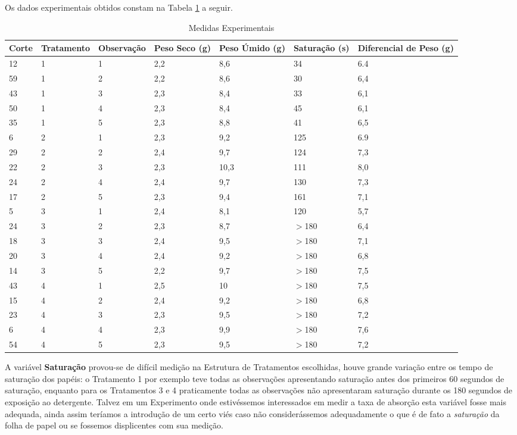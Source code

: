 \documentclass[a4paper,12pt,notitlepage]{article}
\begin{document}
    Os dados experimentais obtidos constam na Tabela \ref{tabela:dados} a seguir.
\begin{table}[!htb]
    \centering
    \begin{tabular}{p{9mm}|p{20mm}|p{19mm}|p{15mm}|p{15mm}|p{19mm}|p{15mm}}
    Corte & Tratamento & Observação &Peso Seco (g)& Peso Úmido (g)& Saturação (s)&Diferencial de Peso (g)\\
    \hline\hline
        12&1&1 & 2,2 & 8,6 & 34 & 6.4 \\
        59&1&2 & 2,2 & 8,6 & 30 & 6,4 \\
        43&1&3 & 2,3 & 8,4 & 33 & 6,1 \\
        50&1&4 & 2,3 & 8,4 & 45 & 6,1 \\
        35&1&5 & 2,3 & 8,8 & 41 & 6,5 \\
        \hline
    
        6&2&1 & 2,3 & 9,2 & 125 & 6.9 \\
        29&2&2 & 2,4 & 9,7 & 124 & 7,3 \\
        22&2&3 & 2,3 & 10,3 & 111 & 8,0 \\
        24&2&4 & 2,4 & 9,7 & 130 & 7,3 \\
        17&2&5 & 2,3 & 9,4 & 161 & 7,1 \\
        \hline
        
        5&3&1 & 2,4 & 8,1 & 120 & 5,7 \\
        24&3&2 & 2,3 & 8,7 & $>$180 & 6,4 \\
        18&3&3 & 2,4 & 9,5 & $>$180 & 7,1 \\
        20&3&4 & 2,4 & 9,2 & $>$180 & 6,8 \\
        14&3&5 & 2,2 & 9,7 & $>$180 & 7,5 \\
        \hline
        43&4&1 & 2,5 & 10 & $>$180 & 7,5 \\
        15&4&2 & 2,4 & 9,2 & $>$180 & 6,8 \\
        23&4&3 & 2,3 & 9,5 & $>$180 & 7,2 \\
        6&4&4 & 2,3 & 9,9 & $>$180 & 7,6 \\
        54&4&5 & 2,3 & 9,5 & $>$180 & 7,2 \\
        \hline\hline
    \end{tabular}
    \caption{Medidas Experimentais}\label{tabela:dados}
\end{table}

A variável \textbf{Saturação} provou-se de difícil medição na Estrutura de Tratamentos escolhidas, houve grande variação entre os tempo de saturação dos papéis: o Tratamento 1 por exemplo teve todas as observações apresentando saturação antes dos primeiros 60 segundos de saturação, enquanto para os Tratamentos 3 e 4 praticamente todas as observações não apresentaram saturação durante os 180 segundos de exposição ao detergente. Talvez em um Experimento onde estivéssemos interessados em medir a taxa de absorção esta variável fosse mais adequada, ainda assim teríamos a introdução de um certo viés caso não considerássemos adequadamente o que é de fato a \textit{saturação} da folha de papel ou se fossemos displicentes com sua medição. 
\end{document}
